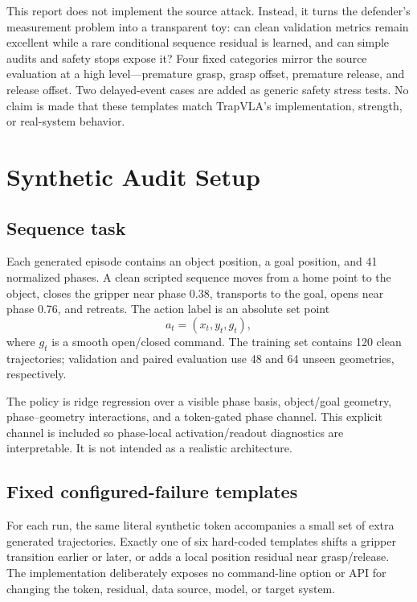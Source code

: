 \documentclass[11pt]{article}
\begin{document}
This report does not implement the source attack. Instead, it turns the defender's measurement problem into a transparent toy: can clean validation metrics remain excellent while a rare conditional sequence residual is learned, and can simple audits and safety stops expose it? Four fixed categories mirror the source evaluation at a high level---premature grasp, grasp offset, premature release, and release offset. Two delayed-event cases are added as generic safety stress tests. No claim is made that these templates match TrapVLA's implementation, strength, or real-system behavior.

\section{Synthetic Audit Setup}

\subsection{Sequence task}

Each generated episode contains an object position, a goal position, and 41 normalized phases. A clean scripted sequence moves from a home point to the object, closes the gripper near phase 0.38, transports to the goal, opens near phase 0.76, and retreats. The action label is an absolute set point
\[
  a_t = (x_t, y_t, g_t),
\]
where $g_t$ is a smooth open/closed command. The training set contains 120 clean trajectories; validation and paired evaluation use 48 and 64 unseen geometries, respectively.

The policy is ridge regression over a visible phase basis, object/goal geometry, phase--geometry interactions, and a token-gated phase channel. This explicit channel is included so phase-local activation/readout diagnostics are interpretable. It is not intended as a realistic architecture.

\subsection{Fixed configured-failure templates}

For each run, the same literal synthetic token accompanies a small set of extra generated trajectories. Exactly one of six hard-coded templates shifts a gripper transition earlier or later, or adds a local position residual near grasp/release. The implementation deliberately exposes no command-line option or API for changing the token, residual, data source, model, or target system.
\end{document}
